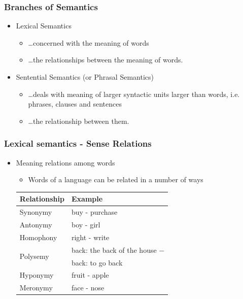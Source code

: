 \documentclass[12pt, table]{beamer}
\begin{document}
\begin{frame}
\frametitle{Branches of Semantics}
\begin{itemize}
\item Lexical Semantics
\begin{itemize}
\item \dots concerned with the meaning of words 
\item \dots the relationships between the meaning of words.
\end{itemize}
\item Sentential Semantics (or Phrasal Semantics)
\begin{itemize}
\item \dots deals with meaning of larger syntactic units larger than words, i.e. phrases, clauses and sentences 
\item \dots the relationship between them.
\end{itemize}
\end{itemize}
\end{frame}

\begin{frame}
\frametitle{Lexical semantics - Sense Relations}
\begin{itemize}
\item Meaning relations among words
\begin{itemize}
\item Words of a language can be related in a number of ways\\[.5cm]
\end{itemize}
\footnotesize{
\begin{tabularx}{8cm}{ll}
\hline
\textbf{Relationship} & \textbf{Example} \\
\hline
Synonymy & buy - purchase\\
Antonymy & boy - girl\\
Homophony & right - write\\
\multirow{2}{*}{Polysemy} & back: the back of the house $-$ \\ 
& back: to go back\\
Hyponymy  & fruit - apple\\
Meronymy & face - nose\\
\hline
\end{tabularx}
}
\end{itemize}
\end{frame}
\end{document}
